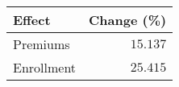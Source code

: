 \begin{longtable}{lr}
\toprule
Effect & Change (\%) \\ 
\midrule\addlinespace[2.5pt]
Premiums & $15.137$ \\ 
Enrollment & $25.415$ \\ 
\bottomrule
\end{longtable}

